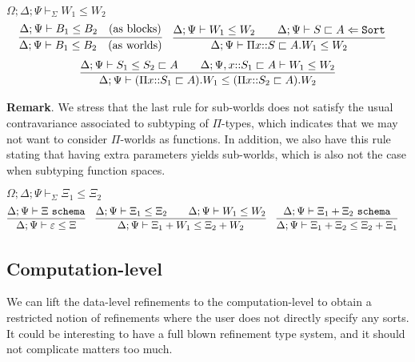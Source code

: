 \documentclass[letterpaper, 11pt]{article}
\newcommand{\Lar}{\Leftarrow}
\newcommand{\Sort}{\texttt{Sort}}
\newcommand{\schema}{\texttt{schema}}
\begin{document}
    $\boxed{\Omega; \Delta; \Psi \vdash_\Sigma W_1 \leq W_2}$ \\
    \begin{align*}
      & \infer{\Delta; \Psi \vdash B_1 \leq B_2 \quad (\text{as worlds})}
              {
                \Delta; \Psi \vdash B_1 \leq B_2 \quad ( \text{as blocks})
              } &
      & \infer{\Delta; \Psi \vdash \Pi x{::}S \sqsubset A. W_1 \leq W_2}
              {
                \Delta ; \Psi \vdash W_1 \leq W_2
                &&
                \Delta; \Psi \vdash S \sqsubset A \Lar \Sort
              }
    \end{align*}
    \begin{align*}
      \infer{\Delta; \Psi \vdash (\Pi x{::} S_1 \sqsubset A).W_1 \leq (\Pi x{::}S_2 \sqsubset A). W_2 }
            {
              \Delta; \Psi \vdash S_1 \leq S_2 \sqsubset A
              &&
              \Delta; \Psi, x{::}S_1 \sqsubset A \vdash W_1 \leq W_2
            }
    \end{align*}

    \textbf{Remark}.  We stress that the last rule for sub-worlds does not satisfy the usual contravariance associated to subtyping of $\Pi$-types, which
    indicates that we may not want to consider $\Pi$-worlds as functions.  In addition, we also have this rule stating that having extra parameters yields
    sub-worlds, which is also not the case when subtyping function spaces.
    
    $\boxed{\Omega; \Delta; \Psi \vdash_\Sigma \Xi_1 \leq \Xi_2}$
    \begin{align*}
      & \infer{\Delta; \Psi \vdash \varepsilon \leq \Xi}{\Delta; \Psi \vdash \Xi \ \schema} &
      & \infer{\Delta; \Psi \vdash \Xi_1 + W_1 \leq \Xi_2 + W_2}
        {
          \Delta; \Psi \vdash \Xi_1 \leq \Xi_2
          &&
          \Delta; \Psi \vdash W_1 \leq W_2
        } &
      & \infer{\Delta; \Psi \vdash \Xi_1 + \Xi_2 \leq \Xi_2 + \Xi_1}{\Delta; \Psi \vdash \Xi_1 + \Xi_2 \ \schema}
    \end{align*}

    \subsection{Computation-level}
    We can lift the data-level refinements to the computation-level to obtain a restricted notion of refinements where the user does not directly
    specify any sorts.  It could be interesting to have a full blown refinement type system, and it should not complicate matters too much.
\end{document}
